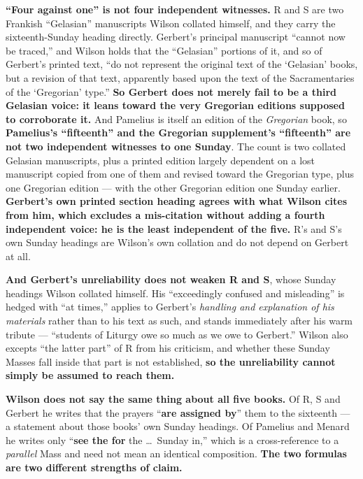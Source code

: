 \textbf{``Four against one'' is not four independent witnesses.} R and S are
two Frankish ``Gelasian'' manuscripts Wilson collated himself, and they carry
the sixteenth-Sunday heading directly. Gerbert's principal manuscript
``cannot now be traced,'' and Wilson holds that the ``Gelasian'' portions of it,
and so of Gerbert's printed text, ``do not represent the original text of the
`Gelasian' books, but a revision of that text, apparently based upon the text of
the Sacramentaries of the `Gregorian' type.'' \textbf{So Gerbert does not merely
fail to be a third Gelasian voice: it leans toward the very Gregorian editions
supposed to corroborate it.} And Pamelius is itself an edition of the
\emph{Gregorian} book, so \textbf{Pamelius's ``fifteenth'' and the Gregorian
supplement's ``fifteenth'' are not two independent witnesses to one Sunday}.
The count is two collated Gelasian manuscripts, plus a printed edition
largely dependent on a lost manuscript copied from one of them and revised
toward the Gregorian type, plus one Gregorian edition --- with the other
Gregorian edition one Sunday earlier. \textbf{Gerbert's own printed section heading agrees with what Wilson cites
from him, which excludes a mis-citation without adding a fourth independent
voice: he is the least independent of the five.} R's and S's own Sunday headings are Wilson's own
collation and do not depend on Gerbert at all.

\textbf{And Gerbert's unreliability does not weaken R and S}, whose Sunday
headings Wilson collated himself. His ``exceedingly confused and misleading'' is
hedged with ``at times,'' applies to Gerbert's
\emph{handling and explanation of his materials} rather than to his text as
such, and stands immediately after his warm tribute --- ``students of
Liturgy owe so much as we owe to Gerbert.'' Wilson also excepts ``the latter
part'' of R from his criticism, and whether these Sunday Masses fall inside that
part is not established, \textbf{so the unreliability cannot simply be assumed
to reach them.}

\textbf{Wilson does not say the same thing about all five books.} Of R, S and
Gerbert he writes that the prayers ``\textbf{are assigned by}'' them to the
sixteenth --- a
statement about those books' own Sunday headings. Of Pamelius and Menard he
writes only ``\textbf{see the  for} the \dots\ Sunday in,'' which is
a cross-reference to a \emph{parallel} Mass and need not mean an identical
composition. \textbf{The two formulas are two different strengths of claim.}

